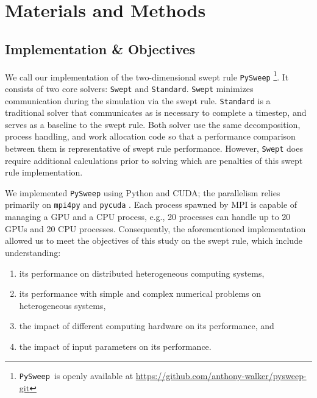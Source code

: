 \documentclass[mca,article,submit,moreauthors,pdftex]{Definitions/mdpi}
\def\github{\url{https://github.com/anthony-walker/pysweep-git}}
\def\pysweep{\texttt{PySweep}}
\def\Swept{\texttt{Swept}}
\def\Standard{\texttt{Standard}}
\begin{document}
\section{Materials and Methods}
\label{methods-section}

\subsection{Implementation \& Objectives}

We call our implementation of the two-dimensional swept rule \pysweep{} \footnote{\pysweep~is openly available at \github}. It consists of two core solvers: \Swept{} and \Standard{}. \Swept{} minimizes communication during the simulation via the swept rule. \Standard{} is a traditional solver that communicates as is necessary to complete a timestep, and serves as a baseline to the swept rule. Both solver use the same decomposition, process handling, and work allocation code so that a performance comparison between them is representative of swept rule performance. However, \Swept{} does require additional calculations prior to solving which are penalties of this swept rule implementation. 

We implemented \pysweep{} using Python and CUDA; the parallelism relies primarily on \texttt{mpi4py} \cite{dalcin_mpi_2005} and \texttt{pycuda} \cite{klockner_pycuda_2012}. Each process spawned by MPI is capable of managing a GPU and a CPU process, e.g., 20 processes can handle up to 20 GPUs and 20 CPU processes. Consequently, the aforementioned implementation allowed us to meet the objectives of this study on the swept rule, which include understanding:
\begin{enumerate}
    \item its performance on distributed heterogeneous computing systems,
    \item its performance with simple and complex numerical problems on heterogeneous systems,
    \item the impact of different computing hardware on its performance, and
    \item the impact of input parameters on its performance.
\end{enumerate}

\end{document}
